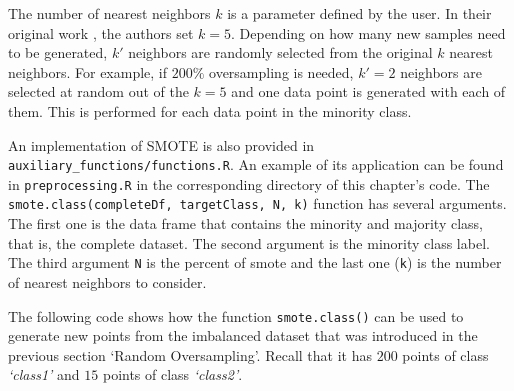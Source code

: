 \documentclass[
  11pt,
]{krantz}
\newenvironment{Shaded}{\begin{snugshade}}{\end{snugshade}}
\newcommand{\AttributeTok}[1]{\textcolor[rgb]{0.61,0.61,0.61}{#1}}
\newcommand{\CommentTok}[1]{\textcolor[rgb]{0.37,0.37,0.37}{\textit{#1}}}
\newcommand{\DecValTok}[1]{\textcolor[rgb]{0.06,0.06,0.06}{#1}}
\newcommand{\FunctionTok}[1]{\textcolor[rgb]{0,0,0}{#1}}
\newcommand{\NormalTok}[1]{#1}
\newcommand{\OtherTok}[1]{\textcolor[rgb]{0.37,0.37,0.37}{#1}}
\newcommand{\SpecialCharTok}[1]{\textcolor[rgb]{0,0,0}{#1}}
\newcommand{\StringTok}[1]{\textcolor[rgb]{0.5,0.5,0.5}{#1}}
\begin{document}
The number of nearest neighbors \(k\) is a parameter defined by the user. In their original work \citep{chawla2002smote}, the authors set \(k=5\). Depending on how many new samples need to be generated, \(k'\) neighbors are randomly selected from the original \(k\) nearest neighbors. For example, if \(200\%\) oversampling is needed, \(k'=2\) neighbors are selected at random out of the \(k=5\) and one data point is generated with each of them. This is performed for each data point in the minority class.

An implementation of SMOTE is also provided in \texttt{auxiliary\_functions/functions.R}. An example of its application can be found in \texttt{preprocessing.R} in the corresponding directory of this chapter's code. The \texttt{smote.class(completeDf,\ targetClass,\ N,\ k)} function has several arguments. The first one is the data frame that contains the minority and majority class, that is, the complete dataset. The second argument is the minority class label. The third argument \texttt{N} is the percent of smote and the last one (\texttt{k}) is the number of nearest neighbors to consider.

The following code shows how the function \texttt{smote.class()} can be used to generate new points from the imbalanced dataset that was introduced in the previous section `Random Oversampling'. Recall that it has \(200\) points of class \emph{`class1'} and \(15\) points of class \emph{`class2'}.

\begin{Shaded}
\end{Shaded}
\end{document}
